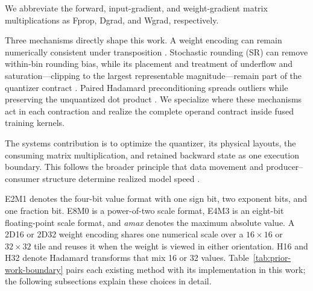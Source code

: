 We abbreviate the forward, input-gradient, and weight-gradient matrix
multiplications as Fprop, Dgrad, and Wgrad, respectively.

Three mechanisms directly shape this work. A weight encoding can
remain numerically consistent under transposition
\cite{nvidia2025nvfp4,rahimifar2026transposition,cim2026nativemxfp4}.
Stochastic rounding (SR) can remove within-bin rounding bias, while its placement
and treatment of underflow and saturation---clipping to the largest
representable magnitude---remain part of the quantizer
contract \cite{gupta2015limited,chmiel2023accurate,ozkara2025sr}. Paired Hadamard preconditioning spreads
outliers while preserving the unquantized dot product
\cite{ashkboos2024quarot,tseng2025mxfp4,nvidia2025nvfp4,
cim2026nativemxfp4}. We specialize where these mechanisms act in each
contraction and realize the complete operand contract inside fused training
kernels.

The systems contribution is to optimize the quantizer, its physical layouts,
the consuming matrix multiplication, and retained backward state as one
execution boundary. This follows the broader principle that data movement and
producer--consumer structure determine realized model speed
\cite{dao2022flashattention,dao2023flashattention2,hsu2024liger,
wijmans2024cutcrossentropy,spector2024thunderkittens,guo2026coda}.

E2M1 denotes the four-bit value format with one sign bit, two exponent bits,
and one fraction bit. E8M0 is a power-of-two scale format, E4M3 is an
eight-bit floating-point scale format, and \emph{amax} denotes the maximum
absolute value. A 2D16 or 2D32 weight encoding shares one numerical scale over
a $16\times16$ or $32\times32$ tile and reuses it when the weight is viewed in
either orientation. H16 and H32 denote Hadamard transforms that mix 16 or 32
values. Table~\ref{tab:prior-work-boundary} pairs each existing method with its
implementation in this work; the following subsections explain these choices
in detail.

